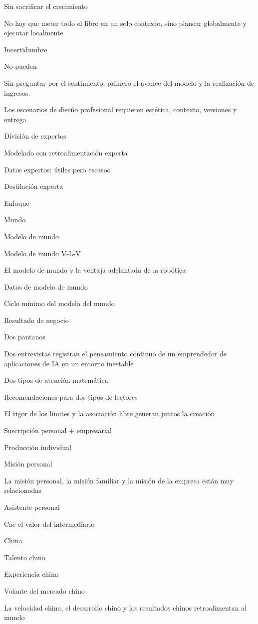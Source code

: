 \documentclass{article}
\begin{document}
Sin sacrificar el crecimiento

No hay que meter todo el libro en un solo contexto, sino planear globalmente y ejecutar localmente

Incertidumbre

No pueden

Sin preguntar por el sentimiento; primero el avance del modelo y la realización de ingresos.

Los escenarios de diseño profesional requieren estética, contexto, versiones y entrega

División de expertos

Modelado con retroalimentación experta

Datos expertos: útiles pero escasos

Destilación experta

Enfoque

Mundo

Modelo de mundo

Modelo de mundo V-L-V

El modelo de mundo y la ventaja adelantada de la robótica

Datos de modelo de mundo

Ciclo mínimo del modelo del mundo

Resultado de negocio

Dos pantanos

Dos entrevistas registran el pensamiento continuo de un emprendedor de aplicaciones de IA en un entorno inestable

Dos tipos de atención matemática

Recomendaciones para dos tipos de lectores

El rigor de los límites y la asociación libre generan juntos la creación

Suscripción personal + empresarial

Producción individual

Misión personal

La misión personal, la misión familiar y la misión de la empresa están muy relacionadas

Asistente personal

Cae el valor del intermediario

China

Talento chino

Experiencia china

Volante del mercado chino

La velocidad china, el desarrollo chino y los resultados chinos retroalimentan al mundo
\end{document}
